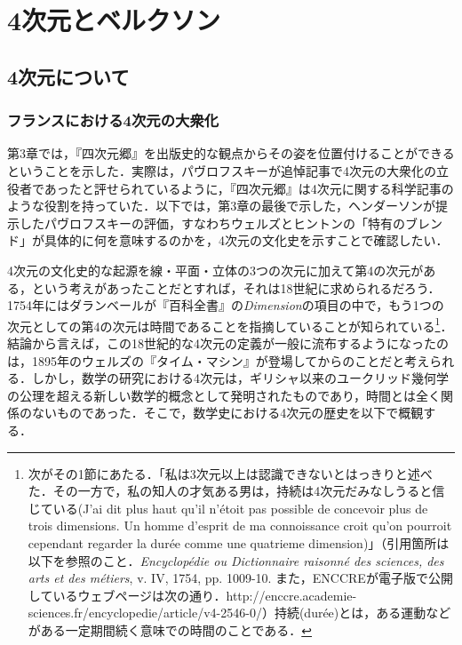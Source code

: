 \chapter{4次元とベルクソン}
\section{4次元について}
\subsection{フランスにおける4次元の大衆化}
第3章では，『四次元郷』を出版史的な観点からその姿を位置付けることができるということを示した．実際は，パヴロフスキーが追悼記事で4次元の大衆化の立役者であったと評せられているように，『四次元郷』は4次元に関する科学記事のような役割を持っていた．以下では，第3章の最後で示した，ヘンダーソンが提示したパヴロフスキーの評価，すなわちウェルズとヒントンの「特有のブレンド」が具体的に何を意味するのかを，4次元の文化史を示すことで確認したい．

4次元の文化史的な起源を線・平面・立体の3つの次元に加えて第4の次元がある，という考えがあったことだとすれば，それは18世紀に求められるだろう．1754年にはダランベールが『百科全書』の\emph{Dimension}の項目の中で，もう1つの次元としての第4の次元は時間であることを指摘していることが知られている\footnote{次がその1節にあたる．「私は3次元以上は認識できないとはっきりと述べた．その一方で，私の知人の才気ある男は，持続は4次元だみなしうると信じている(J’ai dit plus haut qu’il n’étoit pas possible de concevoir plus de trois dimensions. Un homme d’esprit de ma connoissance croit qu’on pourroit cependant regarder la durée comme une quatrieme dimension)」（引用箇所は以下を参照のこと．\emph{Encyclopédie ou Dictionnaire raisonné des sciences, des arts et des métiers}, v. IV, 1754, pp. 1009-10. また，ENCCREが電子版で公開しているウェブページは次の通り．http:\slash\slash enccre.academie-sciences.fr\slash encyclopedie\slash article\slash v4-2546-0\slash ）持続(durée)とは，ある運動などがある一定期間続く意味での時間のことである．}．結論から言えば，この18世紀的な4次元の定義が一般に流布するようになったのは，1895年のウェルズの『タイム・マシン』が登場してからのことだと考えられる．しかし，数学の研究における4次元は，ギリシャ以来のユークリッド幾何学の公理を超える新しい数学的概念として発明されたものであり，時間とは全く関係のないものであった．そこで，数学史における4次元の歴史を以下で概観する．

